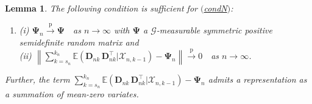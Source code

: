 \documentclass[11pt]{article}
\renewcommand\vec[1]{\boldsymbol{#1}}
\newcommand\mat[1]{\mathbf{#1}}
\newcommand{\E}{\mathbb{E}}
\newcommand{\G}{\mathcal{G}}
\newcommand{\X}{\mathcal{X}}
\newcommand{\labeleditem}[1]{%
  \item[$\mathrm{(}$\csname cond#1\endcsname$\mathrm{)}$]%
  \hypertarget{cond:#1}{}%
}
\newcommand{\refitem}[1]{$\mathrm{(}$\hyperlink{cond:#1}{\csname cond#1\endcsname}$\mathrm{)}$}
\newcommand{\pconverge}{\overset{\mathrm{p}}{\to}}
\newtheorem{lemma}{Lemma}
\theoremstyle{definition}
\begin{document}
\begin{lemma}\label{lemma:nesting-sufficient}
The following condition is sufficient for \refitem{N}:
\begin{enumerate}
    \labeleditem{Nprime} (i) $\mat{\Psi}_n \pconverge \mat{\Psi}\quad$as $n \to \infty$ with $\mat{\Psi}$ a $\G$-measurable symmetric positive semidefinite random matrix and \\
    (ii) $\left\|\sum_{k=s_n}^{k_n} \E\left(\vec{D}_{nk}\, \vec{D}_{nk}^{\top} | \X_{n,k-1}\right) - \mat{\Psi}_n\right\| \pconverge 0 \quad$as $n \to \infty$.
\end{enumerate}
Further, the term $\sum_{k=s_n}^{k_n} \E\left(\vec{D}_{nk}\, \vec{D}_{nk}^{\top} | \X_{n,k-1}\right) - \mat{\Psi}_n$ admits a representation as a summation of mean-zero variates.
\end{lemma}
\end{document}
